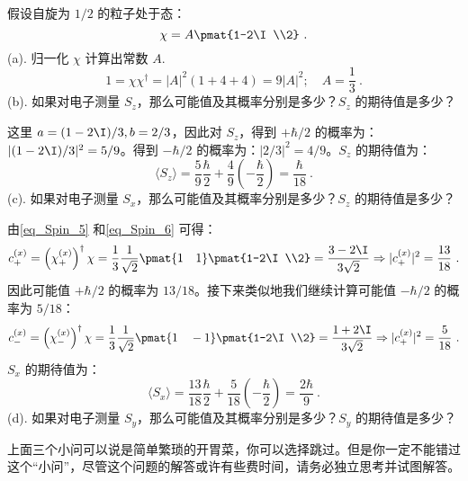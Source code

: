\begin{example}{}
假设自旋为 $1/2$ 的粒子处于态：
\begin{equation}
\chi = A\pmat{1-2\I\\2}~.
\end{equation}
(a). 归一化 $\chi$ 计算出常数 $A$.
\begin{equation}
1=\chi\chi^\dagger=|A|^2(1+4+4)=9|A|^2;\quad A=\frac{1}{3}~.
\end{equation}
(b). 如果对电子测量 $S_z$，那么可能值及其概率分别是多少？$S_z$ 的期待值是多少？

这里 $a=(1-2\I)/3,b=2/3$，因此对 $S_z$，得到 $+\hbar/2$ 的概率为：$|(1-2\I)/3|^2=5/9$。得到 $-\hbar/2$ 的概率为：$|2/3|^2=4/9$。$S_z$ 的期待值为：
\begin{equation}
\langle S_z \rangle =\frac{5}{9}\frac{\hbar}{2}+\frac{4}{9}\left(-\frac{\hbar}{2}\right)=\frac{\hbar}{18}~.
\end{equation}
(c). 如果对电子测量 $S_x$，那么可能值及其概率分别是多少？$S_z$ 的期待值是多少？

由\autoref{eq_Spin_5} 和\autoref{eq_Spin_6} 可得：
\begin{equation}
c_+^{(x)}=\left(\chi_+^{(x)}\right)^\dagger\chi=\frac{1}{3}\frac{1}{\sqrt{2}}\pmat{1\quad 1}\pmat{1-2\I\\2}=\frac{3-2\I}{3\sqrt{2}}\Rightarrow |c_+^{(x)}|^2=\frac{13}{18}~.
\end{equation}
因此可能值 $+\hbar/2$ 的概率为 $13/18$。接下来类似地我们继续计算可能值 $-\hbar/2$ 的概率为 $5/18$：
\begin{equation}
c_-^{(x)}=\left(\chi_-^{(x)}\right)^\dagger\chi=\frac{1}{3}\frac{1}{\sqrt{2}}\pmat{1\quad -1}\pmat{1-2\I\\2}=\frac{1+2\I}{3\sqrt{2}}\Rightarrow |c_+^{(x)}|^2=\frac{5}{18}~.
\end{equation}
$S_x$ 的期待值为：
\begin{equation}
\langle S_x \rangle =\frac{13}{18}\frac{\hbar}{2}+\frac{5}{18}\left(-\frac{\hbar}{2}\right)=\frac{2\hbar}{9}~.
\end{equation}
(d). 如果对电子测量 $S_y$，那么可能值及其概率分别是多少？$S_y$ 的期待值是多少？

上面三个小问可以说是简单繁琐的开胃菜，你可以选择跳过。但是你一定不能错过这个“小问”，尽管这个问题的解答或许有些费时间，请务必独立思考并试图解答。


\end{example}
